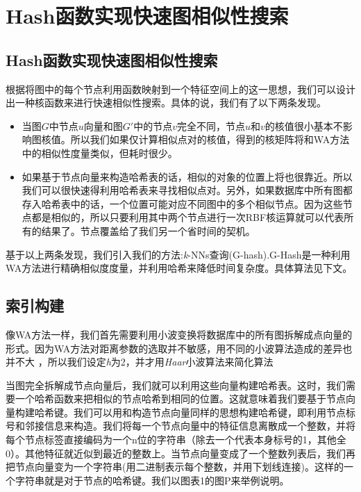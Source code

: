 \documentclass{article}
\begin{document}
\section{Hash函数实现快速图相似性搜索}
\else
\subsection{Hash函数实现快速图相似性搜索}
\fi
根据将图中的每个节点利用函数映射到一个特征空间上的这一思想，我们可以设计出一种核函数来进行快速相似性搜索。具体的说，我们有了以下两条发现。
\begin{itemize}
    \item 当图$G$中节点$u$向量和图$G'$中的节点$v$完全不同，节点$u$和$v$的核值很小基本不影响图核值。所以我们如果仅计算相似点对的核值，得到的核矩阵将和WA方法中的相似性度量类似，但耗时很少。
    \item 如果基于节点向量来构造哈希表的话，相似的对象的位置上将也很靠近。所以我们可以很快速得利用哈希表来寻找相似点对。另外，如果数据库中所有图都存入哈希表中的话，一个位置可能对应不同图中的多个相似节点。因为这些节点都是相似的，所以只要利用其中两个节点进行一次RBF核运算就可以代表所有的结果了。节点覆盖给了我们另一个省时间的契机。
\end{itemize}

基于以上两条发现，我们引入我们的方法:\emph{k}-NNs查询(G-hash).G-Hash是一种利用WA方法进行精确相似度度量，并利用哈希来降低时间复杂度。具体算法见下文。

\subsection{索引构建}
像WA方法一样，我们首先需要利用小波变换将数据库中的所有图拆解成点向量的形式。因为WA方法对距离参数的选取并不敏感，用不同的小波算法造成的差异也并不大\cite{Graph_wavelet} ，所以我们设定\emph{h}为2，并才用\emph{Haar}小波算法来简化算法

当图完全拆解成节点向量后，我们就可以利用这些向量构建哈希表。这时，我们需要一个哈希函数来把相似的节点哈希到相同的位置。这就意味着我们要基于节点向量构建哈希键。我们可以用和构造节点向量同样的思想构建哈希键，即利用节点标号和邻接信息来构造。我们将每一个节点向量中的特征信息离散成一个整数，并将每个节点标签直接编码为一个n位的字符串（除去一个代表本身标号的1，其他全0）。其他特征就近似到最近的整数上。当节点向量变成了一个整数列表后，我们再把节点向量变为一个字符串(用二进制表示每个整数，并用下划线连接)。这样的一个字符串就是对于节点的哈希键。我们以图表1的图P来举例说明。
\end{document}
